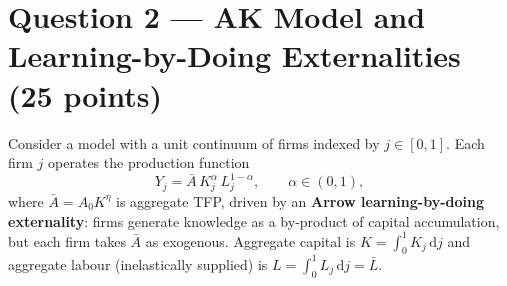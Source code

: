 \documentclass[a4paper,11pt]{article}
\newcommand{\dd}{\mathrm{d}}
\begin{document}
\clearpage

\section{Question 2 --- AK Model and Learning-by-Doing Externalities \hfill (25 points)}

Consider a model with a unit continuum of firms indexed by $j \in [0,1]$.  Each firm $j$
operates the production function
\[
    Y_j = \bar{A}\,K_j^{\alpha}\,L_j^{1-\alpha}, \qquad \alpha \in (0,1),
\]
where $\bar{A} = A_0 K^{\eta}$ is aggregate TFP, driven by an \textbf{Arrow learning-by-doing
externality}: firms generate knowledge as a by-product of capital accumulation, but each firm
takes $\bar{A}$ as exogenous.  Aggregate capital is $K = \int_0^1 K_j\,\dd j$ and aggregate
labour (inelastically supplied) is $L = \int_0^1 L_j\,\dd j = \bar{L}$.
\end{document}

